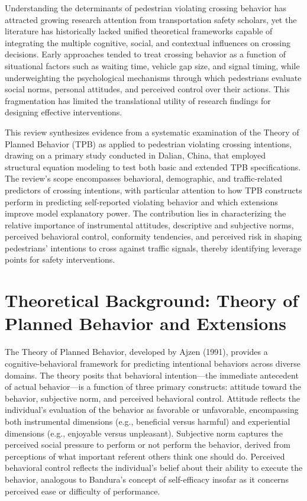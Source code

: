 \documentclass{article}
\begin{document}
Understanding the determinants of pedestrian violating crossing behavior has attracted growing research attention from transportation safety scholars, yet the literature has historically lacked unified theoretical frameworks capable of integrating the multiple cognitive, social, and contextual influences on crossing decisions. Early approaches tended to treat crossing behavior as a function of situational factors such as waiting time, vehicle gap size, and signal timing, while underweighting the psychological mechanisms through which pedestrians evaluate social norms, personal attitudes, and perceived control over their actions. This fragmentation has limited the translational utility of research findings for designing effective interventions. \cite{08_2016_zhou_aap}

This review synthesizes evidence from a systematic examination of the Theory of Planned Behavior (TPB) as applied to pedestrian violating crossing intentions, drawing on a primary study conducted in Dalian, China, that employed structural equation modeling to test both basic and extended TPB specifications. The review's scope encompasses behavioral, demographic, and traffic-related predictors of crossing intentions, with particular attention to how TPB constructs perform in predicting self-reported violating behavior and which extensions improve model explanatory power. The contribution lies in characterizing the relative importance of instrumental attitudes, descriptive and subjective norms, perceived behavioral control, conformity tendencies, and perceived risk in shaping pedestrians' intentions to cross against traffic signals, thereby identifying leverage points for safety interventions. \cite{08_2016_zhou_aap}

\section{Theoretical Background: Theory of Planned Behavior and Extensions}
The Theory of Planned Behavior, developed by Ajzen (1991), provides a cognitive-behavioral framework for predicting intentional behaviors across diverse domains. The theory posits that behavioral intention—the immediate antecedent of actual behavior—is a function of three primary constructs: attitude toward the behavior, subjective norm, and perceived behavioral control. Attitude reflects the individual's evaluation of the behavior as favorable or unfavorable, encompassing both instrumental dimensions (e.g., beneficial versus harmful) and experiential dimensions (e.g., enjoyable versus unpleasant). Subjective norm captures the perceived social pressure to perform or not perform the behavior, derived from perceptions of what important referent others think one should do. Perceived behavioral control reflects the individual's belief about their ability to execute the behavior, analogous to Bandura's concept of self-efficacy insofar as it concerns perceived ease or difficulty of performance. \cite{08_2016_zhou_aap}
\end{document}
